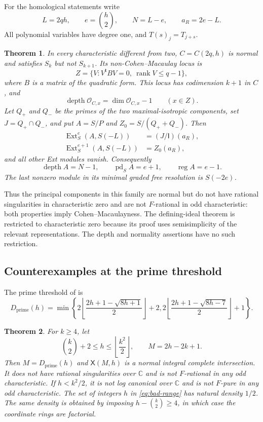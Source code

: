 \documentclass[11pt]{article}
\newtheorem{theorem}{Theorem}[section]
\theoremstyle{definition}
\theoremstyle{remark}
\numberwithin{equation}{section}
\DeclareMathOperator{\rank}{rank}
\DeclareMathOperator{\Ext}{Ext}
\DeclareMathOperator{\depth}{depth}
\DeclareMathOperator{\pd}{pd}
\DeclareMathOperator{\reg}{reg}
\newcommand{\CC}{\mathbb C}
\newcommand{\OO}{\mathcal O}
\newcommand{\XX}{\mathsf X}
\newcommand{\II}{\mathsf I}
\newcommand{\Dpr}{D_{\mathrm{prime}}}
\begin{document}
For the homological statements write
\begin{equation}\label{eq:homological-notation}
 L=2qh,\qquad e=\binom h2,\qquad N=L-e,
 \qquad a_R=2e-L.
\end{equation}
All polynomial variables have degree one, and $T(s)_j=T_{j+s}$.

\begin{theorem}\label{thm:depth-intro}
In every characteristic different from two, $C=C(2q,h)$ is normal
and satisfies $S_k$ but not $S_{k+1}$. Its non-Cohen--Macaulay locus is
\[
 Z=\{V:V^{\mathsf t}BV=0,\ \rank V\leq q-1\},
\]
where $B$ is a matrix of the quadratic form. This locus has codimension
$k+1$ in $C$, and
\[
 \depth\OO_{C,x}=\dim\OO_{C,x}-1\qquad(x\in Z).
\]
Let $Q_+$ and $Q_-$ be the primes of the two maximal-isotropic
components, set $J=Q_+\cap Q_-$, and put $A=S/P$ and
$Z_0=S/(Q_++Q_-)$. Then
\begin{align*}
 \Ext^e_S(A,S(-L))&=(J/\II)(a_R),\\
 \Ext^{e+1}_S(A,S(-L))&=Z_0(a_R),
\end{align*}
and all other Ext modules vanish. Consequently
\[
 \depth A=N-1,\qquad \pd_S A=e+1,\qquad \reg A=e-1.
\]
The last nonzero module in its minimal graded free resolution is
$S(-2e)$.
\end{theorem}

Thus the principal components in this family are normal but do not have
rational singularities in characteristic zero and are not $F$-rational
in odd characteristic: both properties imply Cohen--Macaulayness.
The defining-ideal theorem is restricted to characteristic zero because
its proof uses semisimplicity of the relevant representations. The
depth and normality assertions have no such restriction.

\subsection{Counterexamples at the prime threshold}

The prime threshold of \cite{CS} is
\begin{equation}\label{eq:prime-threshold}
 \Dpr(h)=\min\left\{
 2\left\lfloor\frac{2h+1-\sqrt{8h+1}}2\right\rfloor+2,
 2\left\lfloor\frac{2h+1-\sqrt{8h-7}}2\right\rfloor+1
 \right\}.
\end{equation}

\begin{theorem}\label{thm:negative-intro}
For $k\geq4$, let
\begin{equation}\label{eq:bad-range}
 \binom k2+2\leq h\leq\left\lfloor\frac{k^2}{2}\right\rfloor,
 \qquad M=2h-2k+1.
\end{equation}
Then $M=\Dpr(h)$ and $\XX(M,h)$ is a normal integral complete
intersection. It does not have rational singularities over $\CC$ and
is not $F$-rational in any odd characteristic. If $h<k^2/2$, it is
not log canonical over $\CC$ and is not $F$-pure in any odd
characteristic. The set of integers $h$ in \eqref{eq:bad-range} has
natural density $1/2$. The same density is obtained by imposing
$h-\binom k2\geq4$, in which case the coordinate rings are factorial.
\end{theorem}
\end{document}
